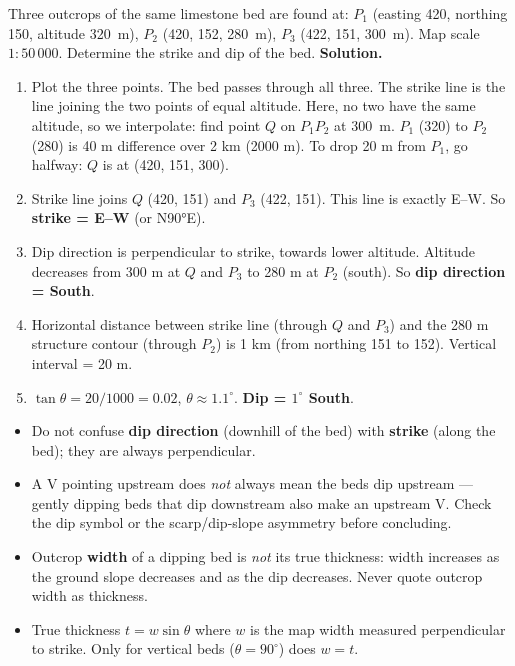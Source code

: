 \documentclass[11pt]{article}
\begin{document}
\begin{exoresolu}
Three outcrops of the same limestone bed are found at: $P_1$ (easting 420, northing 150, altitude \SI{320}{m}), $P_2$ (420, 152, \SI{280}{m}), $P_3$ (422, 151, \SI{300}{m}). Map scale $1:50\,000$. Determine the strike and dip of the bed.
\tcblower
\textbf{Solution.}
\begin{enumerate}
\item Plot the three points. The bed passes through all three. The strike line is the line joining the two points of equal altitude. Here, no two have the same altitude, so we interpolate: find point $Q$ on $P_1P_2$ at \SI{300}{m}. $P_1$ (320) to $P_2$ (280) is 40 m difference over 2 km (2000 m). To drop 20 m from $P_1$, go halfway: $Q$ is at (420, 151, 300).
\item Strike line joins $Q$ (420, 151) and $P_3$ (422, 151). This line is exactly E--W. So \textbf{strike = E--W} (or N90°E).
\item Dip direction is perpendicular to strike, towards lower altitude. Altitude decreases from 300 m at $Q$ and $P_3$ to 280 m at $P_2$ (south). So \textbf{dip direction = South}.
\item Horizontal distance between strike line (through $Q$ and $P_3$) and the 280 m structure contour (through $P_2$) is 1 km (from northing 151 to 152). Vertical interval = 20 m.
\item $\tan\theta = 20/1000 = 0.02$, $\theta \approx 1.1^\circ$. \textbf{Dip = $1^\circ$ South}.
\end{enumerate}
\end{exoresolu}

\begin{attention}
\begin{itemize}
\item Do not confuse \textbf{dip direction} (downhill of the bed) with \textbf{strike} (along the bed); they are always perpendicular.
\item A V pointing upstream does \emph{not} always mean the beds dip upstream — gently dipping beds that dip downstream also make an upstream V. Check the dip symbol or the scarp/dip-slope asymmetry before concluding.
\item Outcrop \textbf{width} of a dipping bed is \emph{not} its true thickness: width increases as the ground slope decreases and as the dip decreases. Never quote outcrop width as thickness.
\item True thickness $t = w \sin\theta$ where $w$ is the map width measured perpendicular to strike. Only for vertical beds ($\theta=90^\circ$) does $w = t$.
\end{itemize}
\end{attention}
\end{document}
